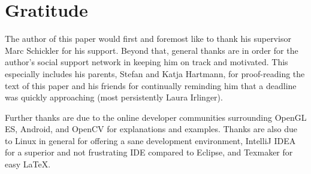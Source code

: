 \section*{Gratitude}

The author of this paper would first and foremost like to thank his supervisor Marc Schickler for his support.
Beyond that, general thanks are in order for the author's social support network in keeping him on track and motivated.
This especially includes his parents, Stefan and Katja Hartmann, for proof-reading the text of this paper and his friends for continually reminding him that a deadline was quickly approaching (most persistently Laura Irlinger).

Further thanks are due to the online developer communities surrounding OpenGL ES, Android, and OpenCV for explanations and examples.
Thanks are also due to Linux in general for offering a sane development environment, IntelliJ IDEA for a superior and not frustrating IDE compared to Eclipse, and Texmaker for easy \LaTeX .
